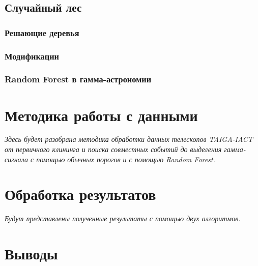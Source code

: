 \documentclass[magd,floatypics,numeref]{msudipl} %
\begin{document}
\section{Случайный лес}
\subsection{Решающие деревья}
\subsection{Модификации}
\subsection{Random Forest в гамма-астрономии}

\chapter{Методика работы с данными}
\textit{Здесь будет разобрана методика обработки данных телескопов TAIGA-IACT от первичного клининга и поиска совместных событий до выделения гамма-сигнала с помощью обычных порогов и с помощью Random Forest.}
\chapter{Обработка результатов}
\textit{Будут представлены полученные результаты с помощью двух алгоритмов. }
\chapter*{Выводы}   %


{}  %
\end{document}
